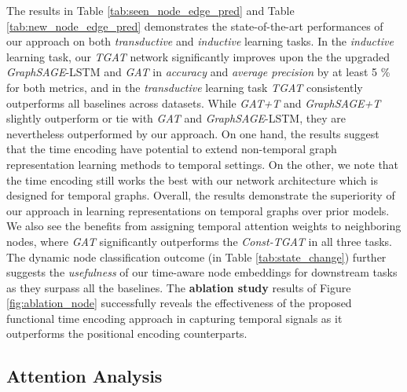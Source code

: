 \documentclass{article} %
\begin{document}
The results in Table \ref{tab:seen_node_edge_pred} and Table \ref{tab:new_node_edge_pred} demonstrates the state-of-the-art performances of our approach on both \emph{transductive} and \emph{inductive} learning tasks. In the \emph{inductive} learning task, our \textsl{TGAT} network significantly improves upon the the upgraded \textsl{GraphSAGE}-LSTM and \textsl{GAT} in \emph{accuracy} and \emph{average precision} by at least 5 \% for both metrics, and in the \emph{transductive} learning task \textsl{TGAT} consistently outperforms all baselines across datasets. While \textsl{GAT+T} and \textsl{GraphSAGE+T} slightly outperform or tie with \textsl{GAT} and \textsl{GraphSAGE}-LSTM, they are nevertheless outperformed by our approach. On one hand, the results suggest that the time encoding have potential to extend non-temporal graph representation learning methods to temporal settings. On the other, we note that the time encoding still works the best with our network architecture which is designed for temporal graphs. Overall, the results demonstrate the superiority of our approach in learning representations on temporal graphs over prior models. We also see the benefits from assigning temporal attention weights to neighboring nodes, where \textsl{GAT} significantly outperforms the \textsl{Const-TGAT} in all three tasks. The dynamic node classification outcome (in Table \ref{tab:state_change}) further suggests the \emph{usefulness} of our time-aware node embeddings for downstream tasks as they surpass all the baselines. The \textbf{ablation study} results of Figure \ref{fig:ablation_node} successfully reveals the effectiveness of the proposed functional time encoding approach in capturing temporal signals as it outperforms the positional encoding counterparts.  


\subsection{Attention Analysis}
\label{sec:analysis}
\end{document}
